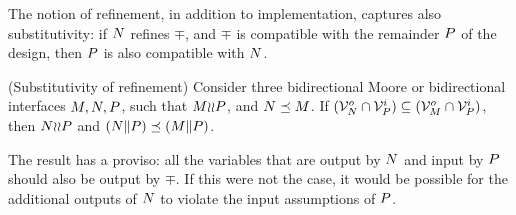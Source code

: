 
\noindent
The notion of refinement, in addition to implementation, captures also
substitutivity: if $N$ refines $\mp$, and $\mp$ is compatible with
the remainder $P$ of the design, then $P$ is also compatible with
$N$. 

\begin{theo}{(Substitutivity of refinement)}
Consider three bidirectional Moore or  bidirectional interfaces
$M, N, P$, such that $M{\wr}{\wr}P$, and $N \preceq M$. 
If $({\cal V}^o_N \cap {\cal V}^i_P) \subseteq ({\cal V}^o_M \cap {\cal V}^i_P)$,
then $N{\wr}{\wr}P$ and $(N \| P) \preceq (M \| P)$. 
\end{theo}

\noindent
The  result has a proviso: all the variables that are output by $N$
and input by $P$ should also be output by $\mp$. 
If this were not the case, it would be possible for the additional
outputs of $N$ to violate the input assumptions of $P$.

